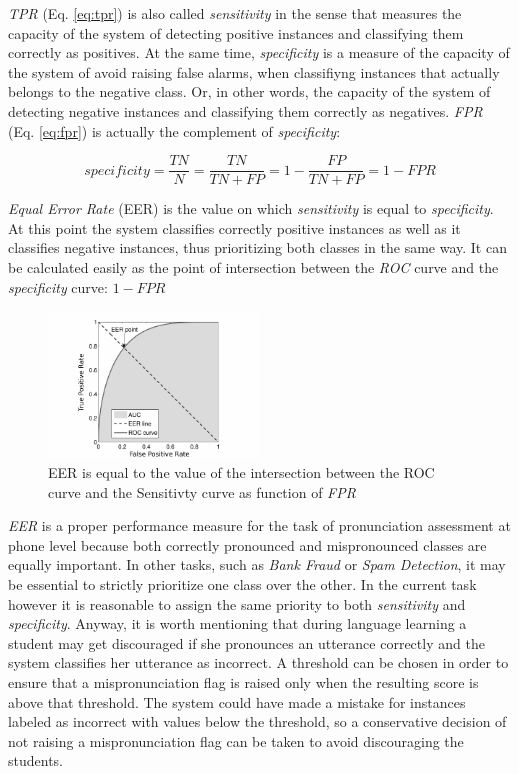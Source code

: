 \textit{TPR} (Eq. \ref{eq:tpr}) is also called \textit{sensitivity} in the sense that measures
the capacity of the system of detecting positive instances and classifying them
correctly as positives.
At the same time, \textit{specificity} is a measure of the capacity of the system of
avoid raising false alarms, when classifiyng instances that actually belongs to the
negative class. Or, in other words, the capacity of the system of detecting negative
instances and classifying them correctly as negatives. \textit{FPR} (Eq. \ref{eq:fpr})
is actually the complement of \textit{specificity}:

\begin{equation}
specificity = \frac{TN}{N} = \frac{TN}{TN+FP} = 1 - \frac{FP}{TN+FP} = 1 - FPR
\end{equation}

\textit{Equal Error Rate} (EER) is the value on which \textit{sensitivity} is equal to
\textit{specificity}. At this point the system classifies correctly positive instances
as well as it classifies negative instances, thus prioritizing both classes in the same
way. It can be calculated easily as the point of intersection between the \textit{ROC}
curve and the \textit{specificity} curve: $1-FPR$

\begin{figure}[H]
  \centering
  \includegraphics[width=0.5\textwidth]{files/figures/method/eer}
  \caption{EER is equal to the value of the intersection between the ROC curve and
  the Sensitivty curve as function of \textit{FPR}}
  \label{fig:eer}
\end{figure}

\textit{EER} is a proper performance measure for the task of pronunciation assessment
at phone level because both correctly pronounced and mispronounced
classes are equally important. In other tasks, such as \textit{Bank Fraud} or
\textit{Spam Detection}, it may be essential to strictly prioritize one class over the
other. In the current task however it is reasonable to assign the same priority
to both \textit{sensitivity} and \textit{specificity}.
Anyway, it is worth mentioning that during language learning a student may get
discouraged if she pronounces an utterance correctly and the system classifies her
utterance as incorrect. A threshold can be chosen in order to ensure that
a mispronunciation flag is raised only when the resulting score is above that
threshold. The system could have made a mistake
for instances labeled as incorrect with values below the threshold, so a conservative
decision of not raising a mispronunciation flag can be taken to avoid discouraging
the students.


